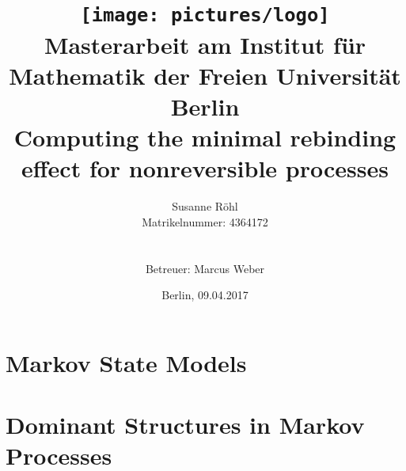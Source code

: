 \documentclass[
  12pt,
  a4paper,
  pdftex,
  oneside,
  DIVcalc,
  openright
  ] {scrreprt}
\title{\texttt{[image: pictures/logo]}\\
{\normalsize Masterarbeit am Institut f\"ur Mathematik der Freien Universit\"at Berlin}\\[4ex]
Computing the minimal rebinding effect for nonreversible processes}
\author{Susanne R\"ohl\\
{\normalsize Matrikelnummer: 4364172}\\
{\normalsize \mailto{susanne.roehl@fu-berlin.de}}\\\\
{\normalsize Betreuer: Marcus Weber}}
\date{Berlin, 09.04.2017}
\begin{document}
\begin{titlepage}

\maketitle
\thispagestyle{empty}




\end{titlepage}

\thispagestyle{empty}
\clearpage{}

\tableofcontents
\clearpage{}


\nocite{*}
%  
%  
%  

\chapter{Markov State Models}\label{chap:markov}
  
  
  
  

\chapter{Dominant Structures in Markov Processes}\label{chap:meta}
  
  
  
  
\end{document}
